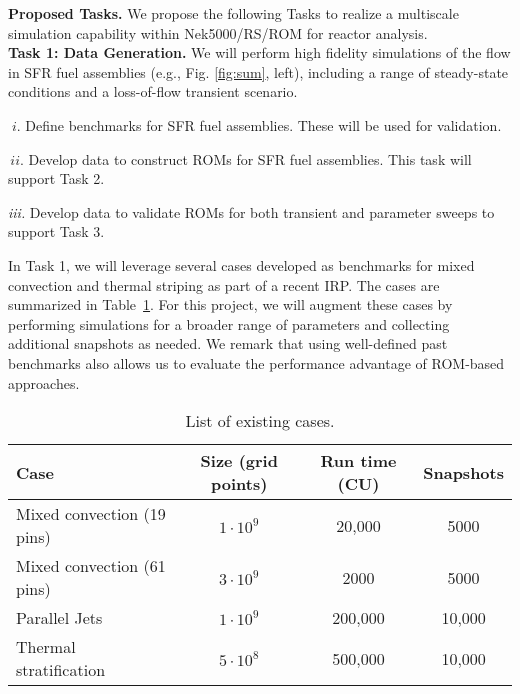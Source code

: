 \noindent
\textbf{Proposed Tasks.}
We propose the following Tasks to realize a multiscale simulation
capability within Nek5000/RS/ROM for reactor analysis.
\\[-2ex]

\noindent
\textbf{Task 1: Data Generation.} We will perform high fidelity simulations of 
the flow in SFR fuel assemblies (e.g., Fig. \ref{fig:sum}, left), including 
a range of steady-state conditions and a loss-of-flow transient scenario.
\\[-4ex]
\begin{description}
\item{$\; i.$}
Define benchmarks for SFR fuel assemblies. These will be used for validation.
\\[-4ex]
\item{$\, ii.$}
Develop data to construct ROMs for SFR fuel assemblies. This
task will support Task 2.  
\\[-4ex]
\item{\em iii.} Develop data to validate ROMs for both
transient and parameter sweeps to support Task 3.
\\[-3ex]
\end{description}
In Task 1, we will leverage several cases developed as benchmarks for mixed
convection and thermal striping as part of a recent IRP. The cases are
summarized in Table~\ref{tab:cases}. For this project, we will augment these
cases by performing simulations for a broader range of parameters and
collecting additional snapshots as needed. We remark that using well-defined
past benchmarks also allows us to evaluate the performance advantage of
ROM-based approaches. \\[-2ex]

\begin{table}
\centering
\begin{tabular}{|l|c|c|c|}
\hline
\textbf{Case} & \textbf{Size} (grid points) & \textbf{Run time} (CU) & \textbf{Snapshots} \\\hline
Mixed convection (19 pins) \cite{kraus22}& $1\cdot 10^{9}$ & 20,000 & 5000 \\
\hline
Mixed convection (61 pins) \cite{kraus22}& $3\cdot 10^{9}$ & 2000 &  5000 \\
\hline
Parallel Jets \cite{acierno22}& $1\cdot 10^{9}$ & 200,000 & 10,000 \\
\hline
Thermal stratification \cite{krohn2018} & $5\cdot 10^{8}$ & 500,000 & 10,000 \\
\hline
\end{tabular}
\caption{\label{tab:cases} List of existing cases.}
\end{table}

